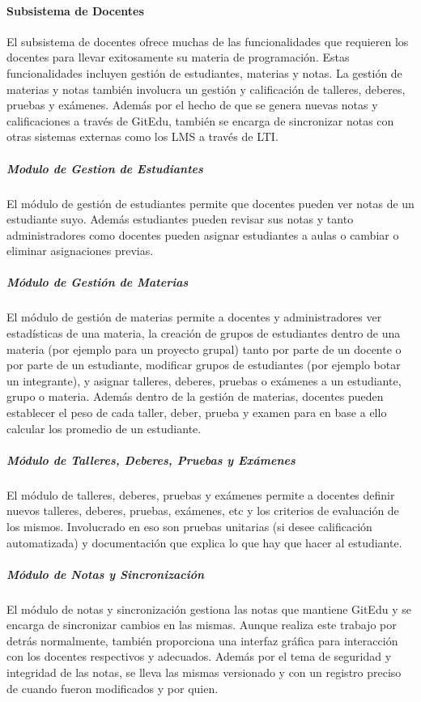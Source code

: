 \paragraph{Subsistema de Docentes}
El subsistema de docentes ofrece muchas de las funcionalidades que requieren los docentes para llevar exitosamente su materia de programación. Estas funcionalidades incluyen gestión de estudiantes, materias y notas. La gestión de materias y notas también involucra un gestión y calificación de talleres, deberes, pruebas y exámenes. Además por el hecho de que se genera nuevas notas y calificaciones a través de GitEdu, también se encarga de sincronizar notas con otras sistemas externas como los LMS a través de LTI.

\subparagraph{Modulo de Gestion de Estudiantes}
El módulo de gestión de estudiantes permite que docentes pueden ver notas de un estudiante suyo. Además estudiantes pueden revisar sus notas y tanto administradores como docentes pueden asignar estudiantes a aulas o cambiar o eliminar asignaciones previas.

\subparagraph{Módulo de Gestión de Materias}
El módulo de gestión de materias permite a docentes y administradores ver estadísticas de una materia, la creación de grupos de estudiantes dentro de una materia (por ejemplo para un proyecto grupal) tanto por parte de un docente o por parte de un estudiante, modificar grupos de estudiantes (por ejemplo botar un integrante), y asignar talleres, deberes, pruebas o exámenes a un estudiante, grupo o materia. Además dentro de la gestión de materias, docentes pueden establecer el peso de cada taller, deber, prueba y examen para en base a ello calcular los promedio de un estudiante.

\subparagraph{Módulo de Talleres, Deberes, Pruebas y Exámenes}
El módulo de talleres, deberes, pruebas y exámenes permite a docentes definir nuevos talleres, deberes, pruebas, exámenes, etc y los criterios de evaluación de los mismos. Involucrado en eso son pruebas unitarias (si desee calificación automatizada) y documentación que explica lo que hay que hacer al estudiante.

\subparagraph{Módulo de Notas y Sincronización}
El módulo de notas y sincronización gestiona las notas que mantiene GitEdu y se encarga de sincronizar cambios en las mismas. Aunque realiza este trabajo por detrás normalmente, también proporciona una interfaz gráfica para interacción con los docentes respectivos y adecuados. Además por el tema de seguridad y integridad de las notas, se lleva las mismas versionado y con un registro preciso de cuando fueron modificados y por quien.


